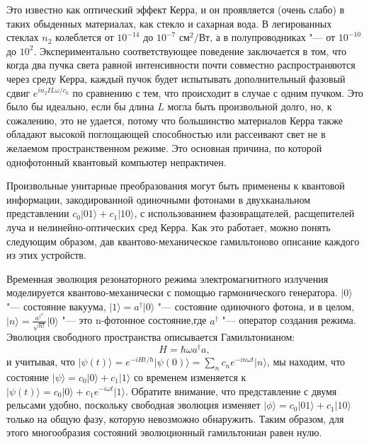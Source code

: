 \begin{multicols}{2}
{        Это известно как оптический эффект Керра, и он проявляется (очень слабо) в
        таких обыденных материалах, как стекло и сахарная вода. В легированных стеклах $n_2$ колеблется от $10^{-14}$ до $10^{-7}$ $\text{см}^2/\text{Вт}$,
        а в полупроводниках "--- от $10^{-10}$ до $10^2$.
        Экспериментально соответствующее поведение заключается в том, что
        когда два пучка света равной интенсивности почти совместно распространяются через
        среду Керра, каждый пучок будет испытывать дополнительный фазовый сдвиг $e^{in_2IL\omega / c_0}$ по сравнению с тем, что
        происходит в случае с одним пучком. Это было бы идеально, если бы длина $L$ могла быть произвольной
        долго, но, к сожалению, это не удается, потому что большинство материалов Керра также обладают высокой поглощающей
        способностью или рассеивают свет не в желаемом пространственном режиме. Это основная причина, по которой однофотонный квантовый компьютер непрактичен.
        
        Произвольные унитарные преобразования могут быть применены к квантовой информации, закодированной одиночными фотонами в двухканальном представлении $c_0\vert01\rangle+c_1\vert10\rangle$, с использованием фазовращателей, расщепителей луча и нелинейно-оптических сред Керра. Как это работает, можно понять следующим образом, дав квантово-механическое гамильтоново описание каждого из этих устройств.

        Временная эволюция резонаторного режима электромагнитного излучения моделируется квантово-механически с помощью гармонического генератора.
        $\vert0\rangle$ "--- состояние вакуума, $\vert1\rangle=a^{\dagger}\vert0\rangle$ "--- состояние одиночного фотона, и в целом, $\vert n\rangle=\frac{a^{\dagger^n}}{\sqrt{n!}}\vert0\rangle$ "--- это n-фотонное состояние,где $a^{\dagger}$ "--- оператор создания режима. Эволюция свободного пространства описывается Гамильтонианом:
        \begin{equation}
            H=\hbar\omega a^{\dagger}a,
        \end{equation}
        и учитывая, что $\vert\psi(t)\rangle=e^{-iHt/\hbar}\vert \psi(0)\rangle=\sum_{n}^{} c_ne^{-in \omega t}\vert n\rangle$, мы находим, что состояние 
        $\vert\psi\rangle=c_0\vert0\rangle+c_1\vert1\rangle$ со временем изменяется к $\vert\psi(t)\rangle=c_0\vert0\rangle+c_1e^{-i\omega t}\vert1\rangle$.
        Обратите внимание, что представление с двумя рельсами удобно, поскольку свободная эволюция изменяет $\vert\phi\rangle=c_0\vert01\rangle+c_1\vert10\rangle$ только на общую фазу, которую невозможно обнаружить. Таким образом, для этого многообразия состояний эволюционный гамильтониан равен нулю.

}
\end{multicols}

